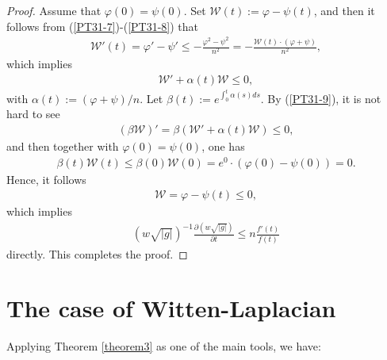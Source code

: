 \documentclass[12pt]{article}
\begin{document}
\begin{proof}
Assume that $\varphi (0)=\psi (0)$. Set
$\mathcal{W}(t):=\varphi-\psi(t)$, and then it follows from
(\ref{PT31-7})-(\ref{PT31-8}) that
 \begin{eqnarray*}
\mathcal{W}'(t)=\varphi'-\psi'\leq-\frac{\varphi^{2}-\psi^{2}}{n^2}=-\frac{\mathcal{W}(t)\cdot(\varphi+\psi)}{n^2},
 \end{eqnarray*}
which implies
 \begin{eqnarray} \label{PT31-9}
 \mathcal{W}'+\alpha(t)\mathcal{W}\leq0,
 \end{eqnarray}
 with $\alpha(t):=(\varphi+\psi)/n$. Let
 $\beta(t):=e^{\int_{0}^{t}\alpha(s)ds}$. By (\ref{PT31-9}), it is not
 hard to see
  \begin{eqnarray*}
 (\beta\mathcal{W})'=\beta\left(\mathcal{W}'+\alpha(t)\mathcal{W}\right)\leq0,
  \end{eqnarray*}
 and then together with $\varphi (0)=\psi (0)$, one has
 \begin{eqnarray*}
\beta(t)\mathcal{W}(t)\leq\beta(0)\mathcal{W}(0)=e^{0}\cdot\left(\varphi
(0)-\psi (0)\right)=0.
 \end{eqnarray*}
 Hence, it follows
 \begin{eqnarray*}
\mathcal{W}=\varphi-\psi(t)\leq0,
 \end{eqnarray*}
which implies
\begin{eqnarray*}
(w\sqrt{|g|})^{-1}\frac{\partial (w\sqrt{|g|})}{\partial t}\leq
n\frac{f'(t)}{f(t)}
\end{eqnarray*}
directly. This completes the proof.
\end{proof}


\section{The case of Witten-Laplacian} \label{sect4}
\renewcommand{\thesection}{\arabic{section}}
\renewcommand{\theequation}{\thesection.\arabic{equation}}
\setcounter{equation}{0}

Applying Theorem \ref{theorem3} as one of the main tools, we have:
\end{document}

